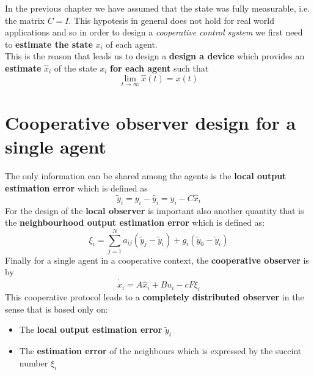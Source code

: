 In the previous chapter we have assumed that the state was fully measurable, i.e. the matrix $C=I$. This hypotesis in general does not hold for real world applications and so in order to design a \textit{cooperative control system} we first need to \textbf{estimate the state} $x_i$ of each agent. \\
This is the reason that leads us to design a \textbf{design a device} which provides an \textbf{estimate} $\hat{x}_i$ of the state $x_i$ \textbf{for each agent} such that 
\begin{equation}
    \lim_{t \to \infty} \hat{x}(t) = x(t)
\end{equation}

\section{Cooperative observer design for a single agent}
The only information can be shared among the agents is the \textbf{local output estimation error} which is defined as
\begin{equation}
    \tilde{y}_i = y_i - \hat{y}_i = y_i - C \hat{x}_i 
\end{equation}
For the design of the \textbf{local observer} is important also another quantity that is the \textbf{neighbourhood output estimation error} which is defined as: 
{\large
    \begin{equation}
        \xi_i = \sum_{j=1}^N {a_{ij} (\tilde{y}_j - \tilde{y}_i) + g_i(\tilde{y}_0 - \tilde{y}_i)}
    \end{equation}
}
Finally for a single agent in a cooperative context, the \textbf{cooperative observer} is by 
\begin{equation}
    \dot{\hat{x}}_i = A \hat{x}_i + B u_i - cF\xi_i
\end{equation}
This cooperative protocol leads to a \textbf{completely distributed observer} in the sense that is based only on: 
\begin{itemize}
    \item The \textbf{local output estimation error} $\tilde{y}_i$
    \item The \textbf{estimation error} of the neighbours which is expressed by the succint number $\xi_i$
\end{itemize} 

